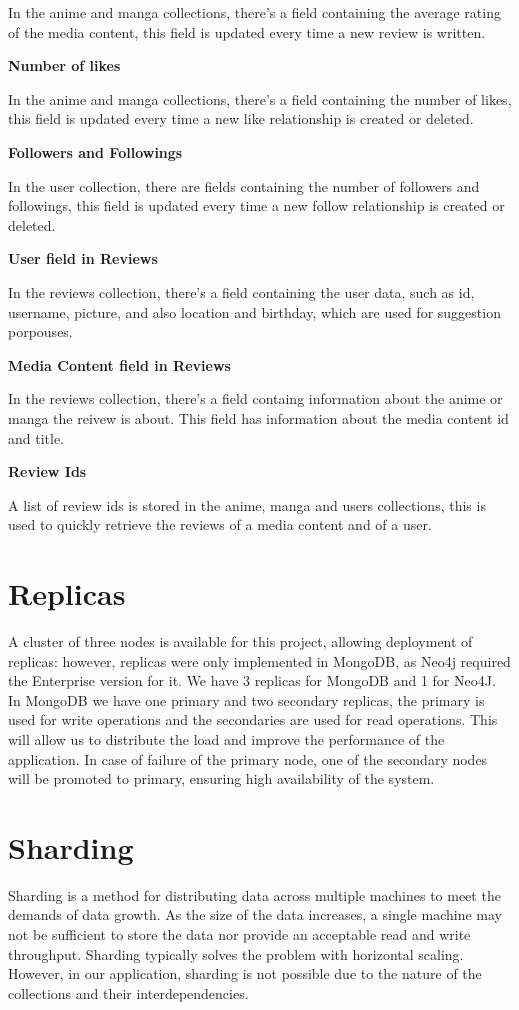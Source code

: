 In the anime and manga collections, there's a field containing the average rating of the media content, this field is updated every time a new review is written.


\textbf{Number of likes}


In the anime and manga collections, there's a field containing the number of likes, this field is updated every time a new like relationship is created or deleted.


\textbf{Followers and Followings}


In the user collection, there are fields containing the number of followers and followings, this field is updated every time a new follow relationship is created or deleted.


\textbf{User field in Reviews}


In the reviews collection, there's a field containing the user data, such as id, username, picture, and also location and birthday, which are used for suggestion porpouses.

\textbf{Media Content field in Reviews}


In the reviews collection, there's a field containg information about the anime or manga the reivew is about. This field has information about the media content id and title.


\textbf{Review Ids}


A list of review ids is stored in the anime, manga and users collections, this is used to quickly retrieve the reviews of a media content and of a user.

\section{Replicas}
A cluster of three nodes is available for this project, allowing deployment of replicas: however, replicas were only implemented in MongoDB, as Neo4j required the Enterprise version for it.
We have 3 replicas for MongoDB and 1 for Neo4J.
In MongoDB we have one primary and two secondary replicas, the primary is used for write operations and the secondaries are used for read operations. This will allow us to distribute the load and improve the performance of the application. In case of failure of the primary node, one of the secondary nodes will be promoted to primary, ensuring high availability of the system.

\newpage
\section{Sharding}
Sharding is a method for distributing data across multiple machines to meet the demands of data growth. As the size of the data increases, a single machine may not be sufficient to store the data nor provide an acceptable read and write throughput. Sharding typically solves the problem with horizontal scaling. However, in our application, sharding is not possible due to the nature of the collections and their interdependencies.

